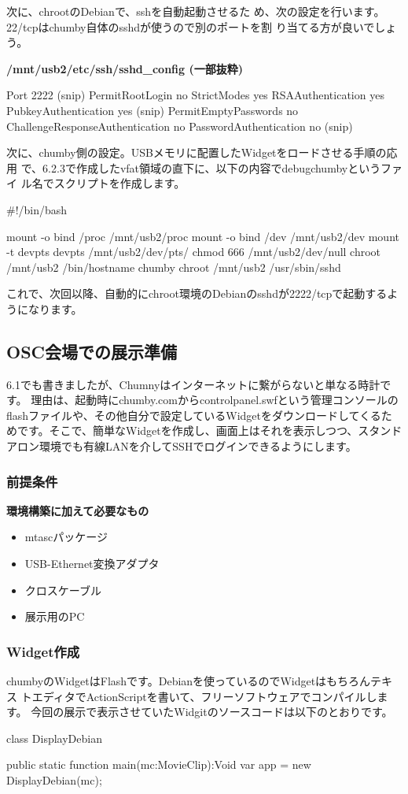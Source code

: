 \documentclass[mingoth,a4paper]{jsarticle}
\begin{document}
\begin{multicols}{2}
次に、chrootのDebianで、sshを自動起動させるた
め、次の設定を行います。22/tcpはchumby自体のsshdが使うので別のポートを割
り当てる方が良いでしょう。

\textbf{/mnt/usb2/etc/ssh/sshd\_config (一部抜粋)}
\begin{commandline}
Port 2222
(snip)
PermitRootLogin no
StrictModes yes
RSAAuthentication yes
PubkeyAuthentication yes
(snip)
PermitEmptyPasswords no
ChallengeResponseAuthentication no
PasswordAuthentication no
(snip)
\end{commandline}
次に、chumby側の設定。USBメモリに配置したWidgetをロードさせる手順の応用
で、6.2.3で作成したvfat領域の直下に、以下の内容でdebugchumbyというファイ
ル名でスクリプトを作成します。
\begin{commandline}
#!/bin/bash

mount -o bind /proc /mnt/usb2/proc
mount -o bind /dev  /mnt/usb2/dev
mount -t devpts devpts /mnt/usb2/dev/pts/
chmod 666 /mnt/usb2/dev/null
chroot /mnt/usb2 /bin/hostname chumby
chroot /mnt/usb2 /usr/sbin/sshd
\end{commandline}
これで、次回以降、自動的にchroot環境のDebianのsshdが2222/tcpで起動するよ
うになります。

\subsection{OSC会場での展示準備}
6.1でも書きましたが、Chumnyはインターネットに繋がらないと単なる時計です。
理由は、起動時にchumby.comからcontrolpanel.swfという管理コンソールの
flashファイルや、その他自分で設定しているWidgetをダウンロードしてくるた
めです。そこで、簡単なWidgetを作成し、画面上はそれを表示しつつ、スタンド
アロン環境でも有線LANを介してSSHでログインできるようにします。

\subsubsection{前提条件}
\textbf{環境構築に加えて必要なもの}
\begin{itemize}
\item mtascパッケージ
\item USB-Ethernet変換アダプタ
\item クロスケーブル
\item 展示用のPC
\end{itemize}

\subsubsection{Widget作成}
chumbyのWidgetはFlashです。Debianを使っているのでWidgetはもちろんテキス
トエディタでActionScriptを書いて、フリーソフトウェアでコンパイルします。
今回の展示で表示させていたWidgitのソースコードは以下のとおりです。
\begin{commandline}
class DisplayDebian {
  public static function main(mc:MovieClip):Void
  {
    var app = new DisplayDebian(mc);
  }

}
\end{commandline}
\end{multicols}
\end{document}
